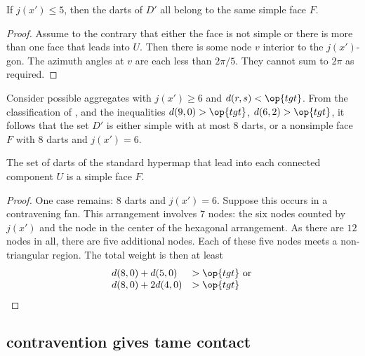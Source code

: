 \begin{lemma}\label{lemma:DU} If $j(x')\le 5$, then the
  darts of $D'$ all belong to the same simple face $F$.
\end{lemma}
%

\begin{proof} Assume to the contrary that either the face is not
  simple or there is more than one face that leads into $U$.  Then
  there is some node $v$ interior to the $j(x')$-gon.  The azimuth
  angles at $v$ are each less than $2\pi/5$. They cannot sum to $2\pi$
  as required.
\end{proof}

Consider possible aggregates with $j(x')\ge 6$ and $d(r,s)<\op{tgt}$.
From the classification of \cite[p.~126,~Fig.~12.1]{Hales:2006:DCG},
and the inequalities $d(9,0) > \op{tgt}$, $d(6,2) > \op{tgt}$, it
follows that the set $D'$ is either simple with at most $8$ darts, or
a nonsimple face $F$ with $8$ darts and $j(x')=6$.

\begin{lemma}\label{lemma:simple} The set of darts of
  the standard hypermap that lead into each connected component $U$ is
  a simple face $F$.
\end{lemma}
%
%

\begin{proof} One case remains: $8$ darts and $j(x')=6$.  Suppose this
  occurs in a contravening fan.  This arrangement involves $7$ nodes:
  the six nodes counted by $j(x')$ and the node in the center of the
  hexagonal arrangement.  As there are $12$ nodes in all, there are
  five additional nodes.  Each of these five nodes meets a
  non-triangular region.  The total weight is then at least
\begin{displaymath}
\begin{array}{lll}
d(8,0) + d(5,0) &> \op{tgt}\hbox{ or }\\
d(8,0) + 2 d(4,0) &> \op{tgt}\\
\end{array}
\end{displaymath}
\end{proof}
%
%








\subsection{contravention gives tame contact}

